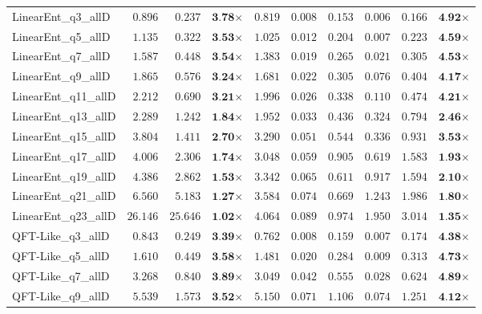 \begin{table*}[t]
{\begin{tabular}{| l || r r c || r r r r r c |}
LinearEnt\_q3\_allD & $0.896$ & $0.237$ & $\textbf{3.78}$$\times$ & $0.819$ & $0.008$ & $0.153$ & $0.006$ & $0.166$ & $\textbf{4.92}$$\times$ \\
LinearEnt\_q5\_allD & $1.135$ & $0.322$ & $\textbf{3.53}$$\times$ & $1.025$ & $0.012$ & $0.204$ & $0.007$ & $0.223$ & $\textbf{4.59}$$\times$ \\
LinearEnt\_q7\_allD & $1.587$ & $0.448$ & $\textbf{3.54}$$\times$ & $1.383$ & $0.019$ & $0.265$ & $0.021$ & $0.305$ & $\textbf{4.53}$$\times$ \\
LinearEnt\_q9\_allD & $1.865$ & $0.576$ & $\textbf{3.24}$$\times$ & $1.681$ & $0.022$ & $0.305$ & $0.076$ & $0.404$ & $\textbf{4.17}$$\times$ \\
LinearEnt\_q11\_allD & $2.212$ & $0.690$ & $\textbf{3.21}$$\times$ & $1.996$ & $0.026$ & $0.338$ & $0.110$ & $0.474$ & $\textbf{4.21}$$\times$ \\
LinearEnt\_q13\_allD & $2.289$ & $1.242$ & $\textbf{1.84}$$\times$ & $1.952$ & $0.033$ & $0.436$ & $0.324$ & $0.794$ & $\textbf{2.46}$$\times$ \\
LinearEnt\_q15\_allD & $3.804$ & $1.411$ & $\textbf{2.70}$$\times$ & $3.290$ & $0.051$ & $0.544$ & $0.336$ & $0.931$ & $\textbf{3.53}$$\times$ \\
LinearEnt\_q17\_allD & $4.006$ & $2.306$ & $\textbf{1.74}$$\times$ & $3.048$ & $0.059$ & $0.905$ & $0.619$ & $1.583$ & $\textbf{1.93}$$\times$ \\
LinearEnt\_q19\_allD & $4.386$ & $2.862$ & $\textbf{1.53}$$\times$ & $3.342$ & $0.065$ & $0.611$ & $0.917$ & $1.594$ & $\textbf{2.10}$$\times$ \\
LinearEnt\_q21\_allD & $6.560$ & $5.183$ & $\textbf{1.27}$$\times$ & $3.584$ & $0.074$ & $0.669$ & $1.243$ & $1.986$ & $\textbf{1.80}$$\times$ \\
LinearEnt\_q23\_allD & $26.146$ & $25.646$ & $\textbf{1.02}$$\times$ & $4.064$ & $0.089$ & $0.974$ & $1.950$ & $3.014$ & $\textbf{1.35}$$\times$ \\
QFT-Like\_q3\_allD & $0.843$ & $0.249$ & $\textbf{3.39}$$\times$ & $0.762$ & $0.008$ & $0.159$ & $0.007$ & $0.174$ & $\textbf{4.38}$$\times$ \\
QFT-Like\_q5\_allD & $1.610$ & $0.449$ & $\textbf{3.58}$$\times$ & $1.481$ & $0.020$ & $0.284$ & $0.009$ & $0.313$ & $\textbf{4.73}$$\times$ \\
QFT-Like\_q7\_allD & $3.268$ & $0.840$ & $\textbf{3.89}$$\times$ & $3.049$ & $0.042$ & $0.555$ & $0.028$ & $0.624$ & $\textbf{4.89}$$\times$ \\
QFT-Like\_q9\_allD & $5.539$ & $1.573$ & $\textbf{3.52}$$\times$ & $5.150$ & $0.071$ & $1.106$ & $0.074$ & $1.251$ & $\textbf{4.12}$$\times$ \\

\end{tabular}}
\end{table*}
